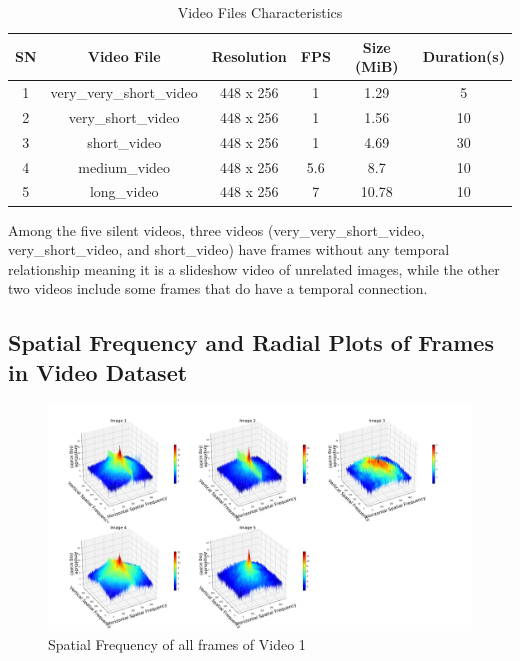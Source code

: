 \documentclass{ioereport}
\begin{document}
\begin{table}[H]
\centering
\caption{Video Files Characteristics}
\label{tab:video_files}
\begin{tabular}{|c|c|c|c|c|c|}
    \hline
    \textbf{SN} & \textbf{Video File} & \textbf{Resolution} & \textbf{FPS} & \textbf{Size (MiB)} & \textbf{Duration(s)}\\ 
    \hline 
    1 & very\_very\_short\_video & 448 x 256 & 1 & 1.29 & 5\\ 
    \hline 
    2 & very\_short\_video &448 x 256 & 1 & 1.56 & 10\\ 
    \hline 
    3 & short\_video & 448 x 256 & 1 & 4.69 & 30 \\ 
    \hline 
    4 & medium\_video & 448 x 256 & 5.6 & 8.7 & 10\\ 
    \hline 
    5 & long\_video & 448 x 256 & 7 & 10.78 & 10\\ 
    \hline
\end{tabular}
\end{table}

Among the five silent videos, three videos (very\_very\_short\_video, very\_short\_video, and short\_video) have frames without any temporal relationship meaning it is a slideshow video of unrelated images, while the other two videos include some frames that do have a temporal connection.


\subsection{Spatial Frequency and Radial Plots of Frames in Video Dataset}
\begin{figure}[H]
    \centering
    \includegraphics[width=\linewidth]{assets/spatial_frequency/video1spatialfreq.png}
    \caption{Spatial Frequency of all frames of Video 1}
    \label{fig:spatial-frequency-1}
\end{figure}
\end{document}
